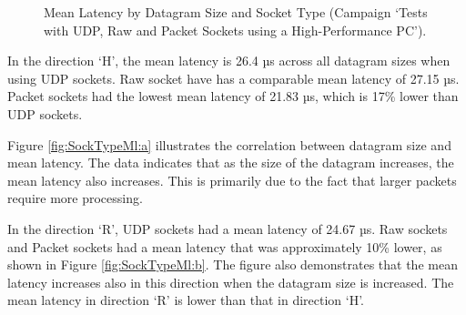 \begin{figure}[h!]
  \centering
  \caption{Mean Latency by Datagram Size and Socket Type (Campaign `Tests with UDP, Raw and Packet Sockets using a High-Performance PC').}
  \label{fig:SockTypeMl}
\end{figure}

In the direction `H', the mean latency is 26.4 µs across all datagram sizes when using UDP sockets. Raw socket have has a comparable mean latency of 27.15 µs. Packet sockets had the lowest mean latency of 21.83 µs, which is 17\% lower than UDP sockets.

Figure \ref{fig:SockTypeMl:a} illustrates the correlation between datagram size and mean latency. The data indicates that as the size of the datagram increases, the mean latency also increases. This is primarily due to the fact that larger packets require more processing.

In the direction `R', UDP sockets had a mean latency of 24.67 µs. Raw sockets and Packet sockets had a mean latency that was approximately 10\% lower, as shown in Figure \ref{fig:SockTypeMl:b}. The figure also demonstrates that the mean latency increases also in this direction when the datagram size is increased. The mean latency in direction `R' is lower than that in direction `H'.

